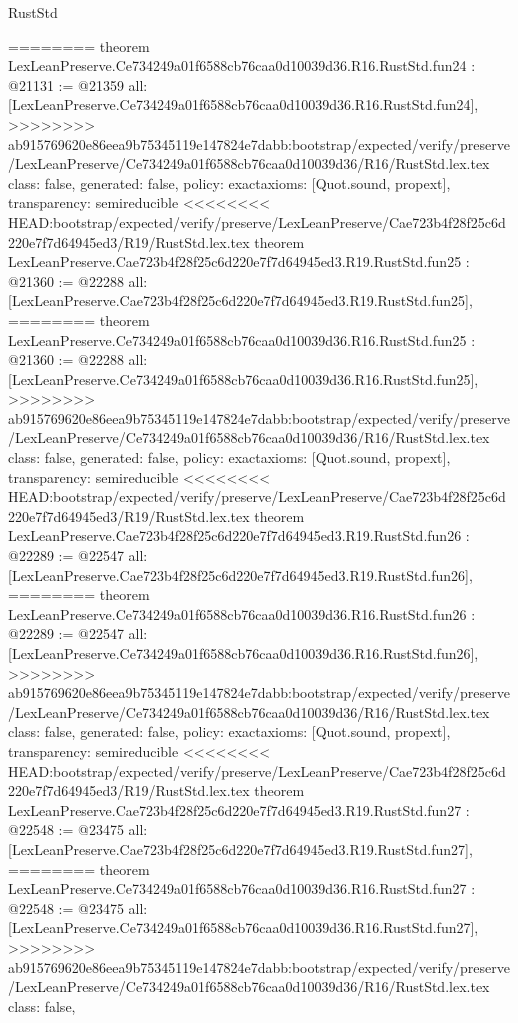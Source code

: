\begin{lexlean}{RustStd}
\begin{coremodule}
{\begin{coremodule}
{{{{{{{{{{{{{{{{{{{{{{{{{{{========
theorem LexLeanPreserve.Ce734249a01f6588cb76caa0d10039d36.R16.RustStd.fun24 : @21131 := @21359 {
  all: [LexLeanPreserve.Ce734249a01f6588cb76caa0d10039d36.R16.RustStd.fun24],
>>>>>>>> ab915769620e86eea9b75345119e147824e7dabb:bootstrap/expected/verify/preserve/LexLeanPreserve/Ce734249a01f6588cb76caa0d10039d36/R16/RustStd.lex.tex
  class: false,
  generated: false,
  policy: exact{axioms: [Quot.sound, propext]},
  transparency: semireducible
}
<<<<<<<< HEAD:bootstrap/expected/verify/preserve/LexLeanPreserve/Cae723b4f28f25c6d220e7f7d64945ed3/R19/RustStd.lex.tex
theorem LexLeanPreserve.Cae723b4f28f25c6d220e7f7d64945ed3.R19.RustStd.fun25 : @21360 := @22288 {
  all: [LexLeanPreserve.Cae723b4f28f25c6d220e7f7d64945ed3.R19.RustStd.fun25],
========
theorem LexLeanPreserve.Ce734249a01f6588cb76caa0d10039d36.R16.RustStd.fun25 : @21360 := @22288 {
  all: [LexLeanPreserve.Ce734249a01f6588cb76caa0d10039d36.R16.RustStd.fun25],
>>>>>>>> ab915769620e86eea9b75345119e147824e7dabb:bootstrap/expected/verify/preserve/LexLeanPreserve/Ce734249a01f6588cb76caa0d10039d36/R16/RustStd.lex.tex
  class: false,
  generated: false,
  policy: exact{axioms: [Quot.sound, propext]},
  transparency: semireducible
}
<<<<<<<< HEAD:bootstrap/expected/verify/preserve/LexLeanPreserve/Cae723b4f28f25c6d220e7f7d64945ed3/R19/RustStd.lex.tex
theorem LexLeanPreserve.Cae723b4f28f25c6d220e7f7d64945ed3.R19.RustStd.fun26 : @22289 := @22547 {
  all: [LexLeanPreserve.Cae723b4f28f25c6d220e7f7d64945ed3.R19.RustStd.fun26],
========
theorem LexLeanPreserve.Ce734249a01f6588cb76caa0d10039d36.R16.RustStd.fun26 : @22289 := @22547 {
  all: [LexLeanPreserve.Ce734249a01f6588cb76caa0d10039d36.R16.RustStd.fun26],
>>>>>>>> ab915769620e86eea9b75345119e147824e7dabb:bootstrap/expected/verify/preserve/LexLeanPreserve/Ce734249a01f6588cb76caa0d10039d36/R16/RustStd.lex.tex
  class: false,
  generated: false,
  policy: exact{axioms: [Quot.sound, propext]},
  transparency: semireducible
}
<<<<<<<< HEAD:bootstrap/expected/verify/preserve/LexLeanPreserve/Cae723b4f28f25c6d220e7f7d64945ed3/R19/RustStd.lex.tex
theorem LexLeanPreserve.Cae723b4f28f25c6d220e7f7d64945ed3.R19.RustStd.fun27 : @22548 := @23475 {
  all: [LexLeanPreserve.Cae723b4f28f25c6d220e7f7d64945ed3.R19.RustStd.fun27],
========
theorem LexLeanPreserve.Ce734249a01f6588cb76caa0d10039d36.R16.RustStd.fun27 : @22548 := @23475 {
  all: [LexLeanPreserve.Ce734249a01f6588cb76caa0d10039d36.R16.RustStd.fun27],
>>>>>>>> ab915769620e86eea9b75345119e147824e7dabb:bootstrap/expected/verify/preserve/LexLeanPreserve/Ce734249a01f6588cb76caa0d10039d36/R16/RustStd.lex.tex
  class: false,
}}}}}}}}}}}}}}}}}}}}}}}}}}}}}}}
\end{coremodule}}
\end{coremodule}
\end{lexlean}
